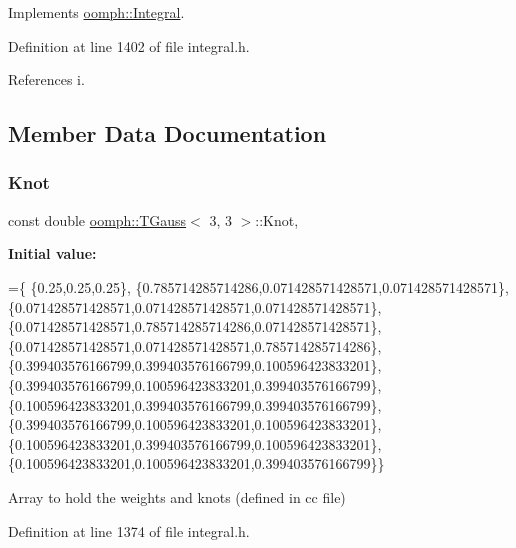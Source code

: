 Implements \hyperlink{classoomph_1_1Integral_ac65335e2aab120b285b3d6c294507b06}{oomph\+::\+Integral}.



Definition at line 1402 of file integral.\+h.



References i.



\subsection{Member Data Documentation}
\mbox{\label{classoomph_1_1TGauss_3_013_00_013_01_4_a29f5170e8115a9b24fb5e0d31e769c4d}} 
\subsubsection{\texorpdfstring{Knot}{Knot}}
{\footnotesize\ttfamily const double \hyperlink{classoomph_1_1TGauss}{oomph\+::\+T\+Gauss}$<$ 3, 3 $>$\+::Knot\hspace{0.3cm}{\ttfamily [static]}, {\ttfamily [private]}}

{\bfseries Initial value\+:}
\begin{DoxyCode}
=\{
 \{0.25,0.25,0.25\},
 \{0.785714285714286,0.071428571428571,0.071428571428571\},
 \{0.071428571428571,0.071428571428571,0.071428571428571\},
 \{0.071428571428571,0.785714285714286,0.071428571428571\},
 \{0.071428571428571,0.071428571428571,0.785714285714286\},
 \{0.399403576166799,0.399403576166799,0.100596423833201\},
 \{0.399403576166799,0.100596423833201,0.399403576166799\},
 \{0.100596423833201,0.399403576166799,0.399403576166799\},
 \{0.399403576166799,0.100596423833201,0.100596423833201\},
 \{0.100596423833201,0.399403576166799,0.100596423833201\},
 \{0.100596423833201,0.100596423833201,0.399403576166799\}\}
\end{DoxyCode}


Array to hold the weights and knots (defined in cc file) 



Definition at line 1374 of file integral.\+h.

\mbox{\label{classoomph_1_1TGauss_3_013_00_013_01_4_a4580f87095e136688fa32b19ee08e5f8}} 
